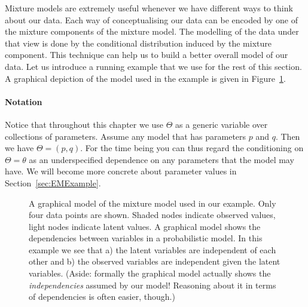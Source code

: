 \documentclass[a4paper,11pt,leqno]{report}\usepackage[]{graphicx}\usepackage[]{color}
\begin{document}
Mixture models are extremely useful whenever we have different ways to think about our data. Each way
of conceptualising our data can be encoded by one of the mixture components of the mixture model. The modelling
of the data under that view is done by the conditional distribution induced by the mixture component.
This technique can help us to build a better overall model of our data. Let us introduce a running example that
we use for the rest of this section. A graphical depiction of the model used in the example is given in Figure~\ref{fig:mixtureGraphical}.

\paragraph{Notation} Notice that throughout this chapter we use $ \Theta $ as a generic variable over collections of parameters. Assume any
model that has parameters $ p $ and $ q $. Then we have $ \Theta = (p,q) $. For the time being you can thus regard the conditioning on $ \Theta = \theta $
as an underspecified dependence on any parameters that the model may have. We will become more concrete about parameter values in Section~\ref{sec:EMExample}.
\begin{figure}
\center
{}
\caption{A graphical model of the mixture model used in our
  example. Only four data points are shown. Shaded nodes indicate observed values, light nodes indicate
latent values. A graphical model shows the dependencies between variables in a probabilistic model. In this example we see that a) the latent variables
are independent of each other and b) the observed variables are independent given the latent variables. (Aside: formally the graphical model actually shows the
\textit{independencies} assumed by our model! Reasoning about it in terms of dependencies is often easier, though.)}
\label{fig:mixtureGraphical}
\end{figure}
\end{document}
